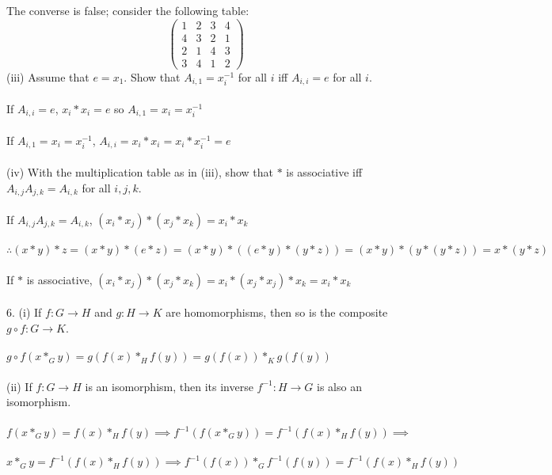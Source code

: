 \documentclass{article}
\begin{document}
\begin{siderules}
\null\qquad The converse is false; consider the following table:
\[\begin{pmatrix}1&2&3&4\\4&3&2&1\\2&1&4&3\\3&4&1&2\end{pmatrix}\]
\color{blue} (iii) Assume that \(e=x_1\). Show that \(A_{i,1}=x_{i}^{-1}\) for all \(i\) iff \(A_{i,i}=e\) for all \(i\).\color{black}\\\\
\null\qquad If \(A_{i,i}=e\), \(x_{i}*x_{i}=e\) so \(A_{i,1}=x_{i}=x_{i}^{-1}\)\\\\
\null\qquad If \(A_{i,1}=x_{i}=x_{i}^{-1}\), \(A_{i,i}=x_{i}*x_{i}=x_{i}*x_{i}^{-1}=e\)\\\\
\color{blue} (iv) With the multiplication table as in \color{gray} (iii)\color{blue}, show that \(*\) is associative iff \(A_{i,j}A_{j,k}=A_{i,k}\) for all \(i,j,k\). \color{black}\\\\
\null\qquad If \(A_{i,j}A_{j,k}=A_{i,k}\), \((x_{i}*x_{j})*(x_{j}*x_{k})=x_{i}*x_{k}\)\\\\
\null\qquad \(\therefore (x*y)*z=(x*y)*(e*z)=(x*y)*((e*y)*(y*z))=(x*y)*(y*(y*z))=x*(y*z)\)\\\\
\null\qquad If \(*\) is associative, \((x_{i}*x_{j})*(x_{j}*x_{k})=x_{i}*(x_{j}*x_{j})*x_{k}=x_{i}*x_{k}\)\\\\
\color{blue} 6. (i) If \(f:G\to H\) and \(g:H\to K\) are homomorphisms, then so is the composite \(g\circ f:G\to K\).\color{black}\\\\
\null\qquad \(g\circ f(x*_{G}y)=g(f(x)*_{H}f(y))=g(f(x))*_{K}g(f(y))\)\\\\
\color{blue} (ii) If \(f:G\to H\) is an isomorphism, then its inverse \(f^{-1}:H\to G\) is also an isomorphism.\\\\\color{black}
\null\qquad \(f(x*_{G}y)=f(x)*_{H}f(y)\implies f^{-1}(f(x*_{G}y))=f^{-1}(f(x)*_{H}f(y))\implies\)\\\\
\null\qquad \(x*_{G}y=f^{-1}(f(x)*_{H}f(y))\implies f^{-1}(f(x))*_{G}f^{-1}(f(y))=f^{-1}(f(x)*_{H}f(y))\)\\\\

\end{siderules}
\end{document}
